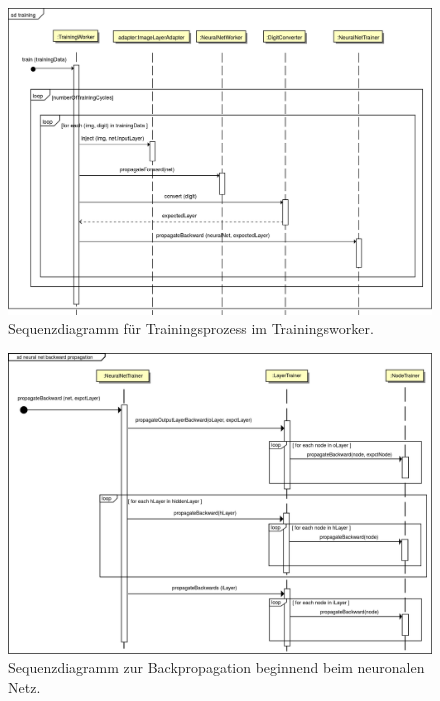 \begin{figure}[H]
\begin{center}
\includegraphics[width=14.2cm]{Abbildungen/UML/jan/trainDetailed1.png}
\caption{Sequenzdiagramm für Trainingsprozess im Trainingsworker.}
\label{fig_sdTraining}
\end{center}
\end{figure}
\vspace{-0.5cm}
\begin{figure}[H]
\begin{center}
\includegraphics[width=15cm]{Abbildungen/UML/jan/gradientdescent1.png}
\caption{Sequenzdiagramm zur Backpropagation beginnend beim neuronalen Netz.}
\label{fig_sdBackpropagation}
\end{center}
\end{figure}

